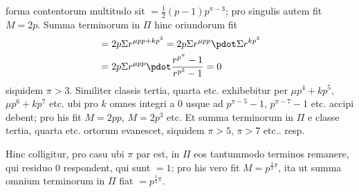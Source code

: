 forma contentorum multitudo sit $=\frac12(p-1)p^{\pi-3}$; pro singulis autem fit $M=2p$. Summa terminorum in $\Pi$ hinc oriundorum fit
\[
\begin{aligned}
&=2p\Sigma r^{\mu pp+kp^3}=2p\Sigma r^{\mu pp}\pdot\Sigma r^{kp^3}\\
&=2p\Sigma r^{\mu pp}\pdot\frac{r^{p^\pi}-1}{r^{p^3}-1}=0
\end{aligned}
\]
siquidem $\pi>3$. Similiter classis tertia, quarta etc. exhibebitur per $\mu p^4+kp^5$, $\mu p^6+kp^7$ etc. ubi pro $k$ omnes integri a $0$ usque ad $p^{\pi-5}-1$, $p^{\pi-7}-1$ etc. accipi debent; pro his fit $M=2pp$, $M=2p^3$ etc. Et summa terminorum in $\Pi$ e classe tertia, quarta etc. ortorum evanescet, siquidem $\pi>5$, $\pi>7$ etc.. resp.
\par Hinc colligitur, pro casu ubi $\pi$ par est, in $\Pi$ eos tantummodo terminos remanere, qui residuo $0$ respondent, qui sunt $=1$; pro his vero fit $M=p^{\frac12\pi}$, ita ut summa omnium terminorum in $\Pi$ fiat $=p^{\frac12\pi}$.
